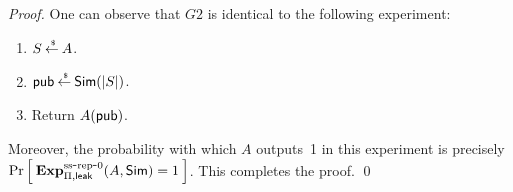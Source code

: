 \begin{proof}
One can observe that $G2$ is identical to the following experiment:
\begin{enumerate}
\item $S {\:\stackrel{{\scriptscriptstyle \hspace{0.2em}\$}} {\leftarrow}\:} A$.
\item ${\sf pub} {\:\stackrel{{\scriptscriptstyle \hspace{0.2em}\$}} {\leftarrow}\:} {\sf Sim}(|S|)$.
\item Return $A({\sf pub})$.
\end{enumerate}
Moreover, the probability with which $A$ outputs~1 in this experiment is
precisely $\Pr\left[\: \mathrm{\mathbf{Exp}}^{\mathrm{ss\mbox{-}rep\mbox{-}0}}_{\Pi,{\sf leak}}(A, {\sf Sim})=1 \:\right]$.
This completes the proof. \hfill\qed
\end{proof}

